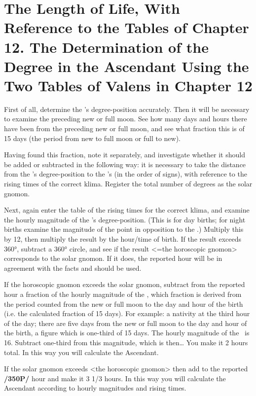 \section{The Length of Life, With Reference to the Tables of Chapter 12. The Determination of the Degree in the Ascendant Using the Two Tables of Valens in Chapter 12}

First of all, determine the \Sun’s degree-position accurately. Then it will be necessary to examine the preceding new or full moon. See how many days and hours there have been from the preceding new or full
moon, and see what fraction this is of 15 days (the period from new to full moon or full to new). 

Having found this fraction, note it separately, and investigate whether it should be added or subtracted in the following way: it is necessary to take the distance from the \Sun’s degree-position to the \Moon’s (in the
order of signs), with reference to the rising times of the correct klima. Register the total number of degrees as the solar gnomon. 

Next, again enter the table of the rising times for the correct klima, and examine the hourly magnitude of the \Sun’s degree-position. (This is for day births; for night births examine the magnitude of the point in opposition to the \Sun.) Multiply this by 12, then multiply the result by the hour/time of birth. If the result exceeds 360°, subtract a 360° circle, and see if the result <=the horoscopic gnomon> corresponds to the solar gnomon. If it does, the reported hour will be in agreement with the facts and should be used. 

If the horoscopic gnomon exceeds the solar gnomon, subtract from the reported hour a fraction of the hourly magnitude of the \Sun, which fraction is derived from the period counted from the new or full moon to the day and hour of the birth (i.e. the calculated fraction of 15 days).
For example: a nativity at the third hour of the day; there are five days from the new or full moon to the day and hour of the birth, a figure which is one-third of 15 days. The hourly magnitude of the \Sun\, is
16. Subtract one-third from this magnitude, which is then… You make it 2 hours total. In this way you will calculate the Ascendant. 

If the solar gnomon exceeds <the horoscopic gnomon> then add to the
reported \textbf{/350P/} hour and make it 3 1/3 hours. In this way you will calculate the Ascendant according to hourly magnitudes and rising times.

